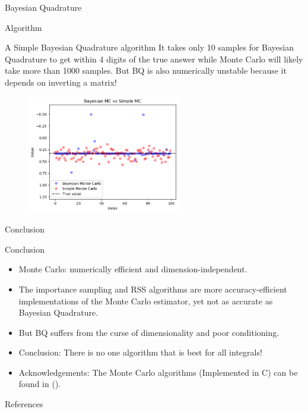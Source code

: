 \documentclass{beamer}
\begin{document}
\begin{section}{Bayesian Quadrature}
\begin{subsection}{Algorithm}
\begin{frame}{A Simple Bayesian Quadrature algorithm}
    It takes only 10 samples for Bayesian Quadrature to get within 4 digits of the true answer while Monte Carlo will likely take more than 1000 samples. But BQ is also numerically unstable because it depends on inverting a matrix! 
    \begin{figure}[h]
        \centering
        \includegraphics[width=0.6\textwidth]{output_30_0.png}
        \label{fig:Comparison}
    \end{figure}
    
    
\end{frame}
\end{subsection}
\end{section}
\begin{section}{Conclusion}

\begin{frame}{Conclusion}
\begin{itemize}
    \item Monte Carlo: numerically efficient and dimension-independent.
    \pause 
    \item The importance sampling and RSS algorithms are more accuracy-efficient implementations of the Monte Carlo estimator, yet not as accurate as Bayesian Quadrature.
    \pause
    \item But BQ suffers from the curse of dimensionality and poor conditioning.
    \pause
    \item Conclusion: There is no one algorithm that is best for all integrals!
    \pause
    \item Acknowledgements: The Monte Carlo algorithms (Implemented in C) can be found in (\cite{PTVF}).
\end{itemize}    
\end{frame}

\end{section}

\begin{frame}{References}
    \printbibliography
\end{frame}
\end{document}
